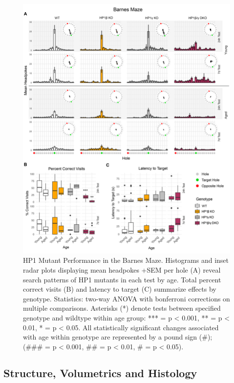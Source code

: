 \documentclass[onehalf,12pt]{beavtex}
\begin{document}
  \begin{figure}
  
  {\centering \includegraphics[width=1\linewidth, ]{./figure/results/barnes} 
  
  }
  
  \caption[HP1 Mutant Performance in the Barnes Maze]{HP1 Mutant Performance in the Barnes Maze. Histograms and inset radar plots displaying mean headpokes +SEM per hole (A) reveal search patterns of HP1 mutants in each test by age.  Total percent correct visits (B) and latency to target (C) summarize effects by genotype. Statistics: two-way ANOVA with bonferroni corrections on multiple comparisons. Asterisks (*) denote tests between specified genotype and wildtype within age group: *** = p < 0.001, ** = p < 0.01, * = p < 0.05. All statistically significant changes associated with age within genotype are represented by a pound sign (\#); (\#\#\# = p < 0.001, \#\# = p < 0.01, \# = p < 0.05).}\label{fig:barnes}
  \end{figure}
  
  \FloatBarrier
  
  \subsection{Structure, Volumetrics and Histology}\label{MRIresults}
  
\end{document}
